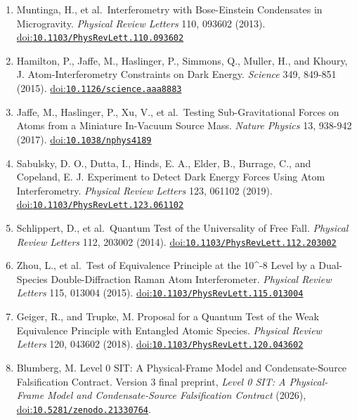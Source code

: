 \documentclass[
  american,
  11pt,
  letterpaper,
]{article}
\begin{document}
\begin{enumerate}
\item
  Muntinga, H., et al.~Interferometry with Bose-Einstein Condensates in Microgravity. \emph{Physical Review Letters} 110, 093602 (2013). \href{https://doi.org/10.1103/PhysRevLett.110.093602}{doi:\nolinkurl{10.1103/PhysRevLett.110.093602}}
\item
  Hamilton, P., Jaffe, M., Haslinger, P., Simmons, Q., Muller, H., and Khoury, J. Atom-Interferometry Constraints on Dark Energy. \emph{Science} 349, 849-851 (2015). \href{https://doi.org/10.1126/science.aaa8883}{doi:\nolinkurl{10.1126/science.aaa8883}}
\item
  Jaffe, M., Haslinger, P., Xu, V., et al.~Testing Sub-Gravitational Forces on Atoms from a Miniature In-Vacuum Source Mass. \emph{Nature Physics} 13, 938-942 (2017). \href{https://doi.org/10.1038/nphys4189}{doi:\nolinkurl{10.1038/nphys4189}}
\item
  Sabulsky, D. O., Dutta, I., Hinds, E. A., Elder, B., Burrage, C., and Copeland, E. J. Experiment to Detect Dark Energy Forces Using Atom Interferometry. \emph{Physical Review Letters} 123, 061102 (2019). \href{https://doi.org/10.1103/PhysRevLett.123.061102}{doi:\nolinkurl{10.1103/PhysRevLett.123.061102}}
\item
  Schlippert, D., et al.~Quantum Test of the Universality of Free Fall. \emph{Physical Review Letters} 112, 203002 (2014). \href{https://doi.org/10.1103/PhysRevLett.112.203002}{doi:\nolinkurl{10.1103/PhysRevLett.112.203002}}
\item
  Zhou, L., et al.~Test of Equivalence Principle at the 10\^{}-8 Level by a Dual-Species Double-Diffraction Raman Atom Interferometer. \emph{Physical Review Letters} 115, 013004 (2015). \href{https://doi.org/10.1103/PhysRevLett.115.013004}{doi:\nolinkurl{10.1103/PhysRevLett.115.013004}}
\item
  Geiger, R., and Trupke, M. Proposal for a Quantum Test of the Weak Equivalence Principle with Entangled Atomic Species. \emph{Physical Review Letters} 120, 043602 (2018). \href{https://doi.org/10.1103/PhysRevLett.120.043602}{doi:\nolinkurl{10.1103/PhysRevLett.120.043602}}
\item
  Blumberg, M. Level 0 SIT: A Physical-Frame Model and Condensate-Source Falsification Contract. Version 3 final preprint, \emph{Level 0 SIT: A Physical-Frame Model and Condensate-Source Falsification Contract} (2026), \href{https://doi.org/10.5281/zenodo.21330764}{doi:\nolinkurl{10.5281/zenodo.21330764}}.
\end{enumerate}
\end{document}
